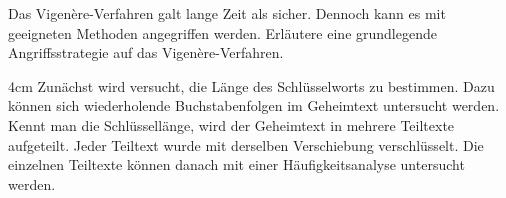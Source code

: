 \question[4]
Das Vigenère-Verfahren galt lange Zeit als sicher. Dennoch kann es mit
geeigneten Methoden angegriffen werden.
Erläutere eine grundlegende Angriffsstrategie auf das Vigenère-Verfahren.


\begin{solutionbox}{4cm}
Zunächst wird versucht, die Länge des Schlüsselworts zu bestimmen.
Dazu können sich wiederholende Buchstabenfolgen im Geheimtext untersucht werden.
Kennt man die Schlüssellänge, wird der Geheimtext in mehrere Teiltexte aufgeteilt.
Jeder Teiltext wurde mit derselben Verschiebung verschlüsselt.
Die einzelnen Teiltexte können danach mit einer Häufigkeitsanalyse untersucht werden.
\end{solutionbox}